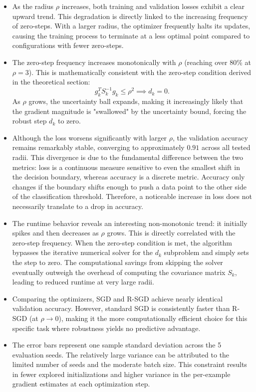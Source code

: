 \begin{itemize}
    \item As the radius \(\rho\) increases, both training and validation losses exhibit a clear upward trend. This degradation is directly linked to the increasing frequency of zero-steps. With a larger radius, the optimizer frequently halts its updates, causing the training process to terminate at a less optimal point compared to configurations with fewer zero-steps.
    
    \item The zero-step frequency increases monotonically with \(\rho\) (reaching over 80\% at \(\rho=3\)). This is mathematically consistent with the zero-step condition derived in the theoretical section:
    \begin{equation}
        g_k^T S_k^{-1} g_k \le \rho^2 \implies d_k = 0.
    \end{equation}
    As \(\rho\) grows, the uncertainty ball expands, making it increasingly likely that the gradient magnitude is "swallowed" by the uncertainty bound, forcing the robust step \(d_k\) to zero.
    
    \item Although the loss worsens significantly with larger \(\rho\), the validation accuracy remains remarkably stable, converging to approximately \(0.91\) across all tested radii. This divergence is due to the fundamental difference between the two metrics: loss is a continuous measure sensitive to even the smallest shift in the decision boundary, whereas accuracy is a discrete metric. Accuracy only changes if the boundary shifts enough to push a data point to the other side of the classification threshold. Therefore, a noticeable increase in loss does not necessarily translate to a drop in accuracy.
    
    \item The runtime behavior reveals an interesting non-monotonic trend: it initially spikes and then decreases as \(\rho\) grows. This is directly correlated with the zero-step frequency. When the zero-step condition is met, the algorithm bypasses the iterative numerical solver for the \(d_k\) subproblem and simply sets the step to zero. The computational savings from skipping the solver eventually outweigh the overhead of computing the covariance matrix \(S_k\), leading to reduced runtime at very large radii.
    
    \item Comparing the optimizers, SGD and R-SGD achieve nearly identical validation accuracy. However, standard SGD is consistently faster than R-SGD (at \(\rho \to 0\)), making it the more computationally efficient choice for this specific task where robustness yields no predictive advantage.
    
    \item The error bars represent one sample standard deviation across the 5 evaluation seeds. The relatively large variance can be attributed to the limited number of seeds and the moderate batch size. This constraint results in fewer explored initializations and higher variance in the per-example gradient estimates at each optimization step.
\end{itemize}

